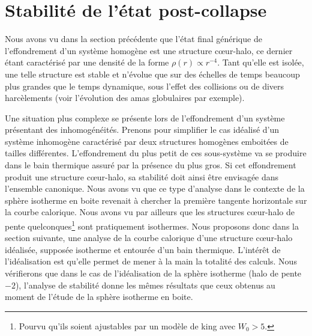 \section{Stabilité de l'état post-collapse\label{Sec::ToyModel}}

Nous avons vu dans la section précédente que l'état final générique de l'effondrement d'un système homogène est une structure cœur-halo, ce dernier
étant caractérisé par une densité de la forme $\rho(r)\propto r^{-4}$. Tant qu'elle est isolée, une telle structure est stable et n'évolue que sur des
échelles de temps beaucoup plus grandes que le temps dynamique, sous l'effet des collisions ou de divers harcèlements (voir l'évolution des amas
globulaires par exemple).

Une situation plus complexe se présente lors de l'effondrement d'un système présentant des inhomogénéités. Prenons pour simplifier le cas idéalisé
d'un système inhomogène caractérisé par deux structures homogènes emboitées de tailles différentes. L'effondrement du plus petit de ces sous-système
va se produire dans le bain thermique assuré par la présence du plus gros. Si cet effondrement produit une structure cœur-halo, sa stabilité doit
ainsi être envisagée dans l'ensemble canonique. Nous avons vu que ce type d'analyse dans le contexte de la sphère isotherme en boite revenait à
chercher la première tangente horizontale sur la courbe calorique. Nous avons vu par ailleurs que les structures cœur-halo de pente
quelconques\footnote{Pourvu qu'ils soient ajustables par un modèle de king avec $W_0 > 5$.} sont pratiquement isothermes. Nous proposons donc dans la
section suivante, une analyse de la courbe calorique d'une structure cœur-halo idéalisée, supposée isotherme et entourée d'un bain thermique.
L'intérêt de l'idéalisation est qu'elle permet de mener à la main la totalité des calculs. Nous vérifierons que dans le cas de l'idéalisation de la
sphère isotherme (halo de pente $-2$), l'analyse de stabilité donne les mêmes résultats que ceux obtenus au moment de l'étude de la sphère isotherme en
boite.


